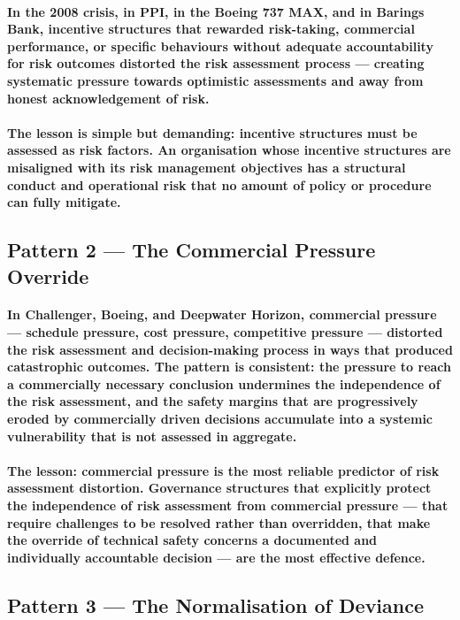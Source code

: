 \paragraph{In the 2008 crisis, in PPI, in the Boeing 737 MAX, and in Barings Bank, incentive structures that rewarded risk-taking, commercial performance, or specific behaviours without adequate accountability for risk outcomes distorted the risk assessment process — creating systematic pressure towards optimistic assessments and away from honest acknowledgement of risk.}
\paragraph{The lesson is simple but demanding: \textbf{incentive structures must be assessed as risk factors}. An organisation whose incentive structures are misaligned with its risk management objectives has a structural conduct and operational risk that no amount of policy or procedure can fully mitigate.}

\subsection{Pattern 2 — The Commercial Pressure Override}
\paragraph{In Challenger, Boeing, and Deepwater Horizon, commercial pressure — schedule pressure, cost pressure, competitive pressure — distorted the risk assessment and decision-making process in ways that produced catastrophic outcomes. The pattern is consistent: the pressure to reach a commercially necessary conclusion undermines the independence of the risk assessment, and the safety margins that are progressively eroded by commercially driven decisions accumulate into a systemic vulnerability that is not assessed in aggregate.}
\paragraph{The lesson: \textbf{commercial pressure is the most reliable predictor of risk assessment distortion}. Governance structures that explicitly protect the independence of risk assessment from commercial pressure — that require challenges to be resolved rather than overridden, that make the override of technical safety concerns a documented and individually accountable decision — are the most effective defence.}

\subsection{Pattern 3 — The Normalisation of Deviance}
